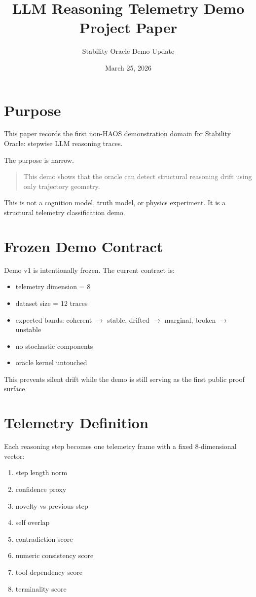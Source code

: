 \documentclass[11pt]{article}
\title{LLM Reasoning Telemetry Demo\\Project Paper}
\author{Stability Oracle Demo Update}
\date{March 25, 2026}
\begin{document}
\maketitle
\tableofcontents
\newpage

\section{Purpose}

This paper records the first non-HAOS demonstration domain for Stability Oracle:
stepwise LLM reasoning traces.

The purpose is narrow.

\begin{quote}
This demo shows that the oracle can detect structural reasoning drift using only trajectory geometry.
\end{quote}

This is not a cognition model, truth model, or physics experiment.
It is a structural telemetry classification demo.

\section{Frozen Demo Contract}

Demo v1 is intentionally frozen.
The current contract is:

\begin{itemize}
\item telemetry dimension = 8
\item dataset size = 12 traces
\item expected bands: coherent $\rightarrow$ stable, drifted $\rightarrow$ marginal, broken $\rightarrow$ unstable
\item no stochastic components
\item oracle kernel untouched
\end{itemize}

This prevents silent drift while the demo is still serving as the first public proof surface.

\section{Telemetry Definition}

Each reasoning step becomes one telemetry frame with a fixed 8-dimensional vector:

\begin{enumerate}
\item step length norm
\item confidence proxy
\item novelty vs previous step
\item self overlap
\item contradiction score
\item numeric consistency score
\item tool dependency score
\item terminality score
\end{enumerate}
\end{document}

